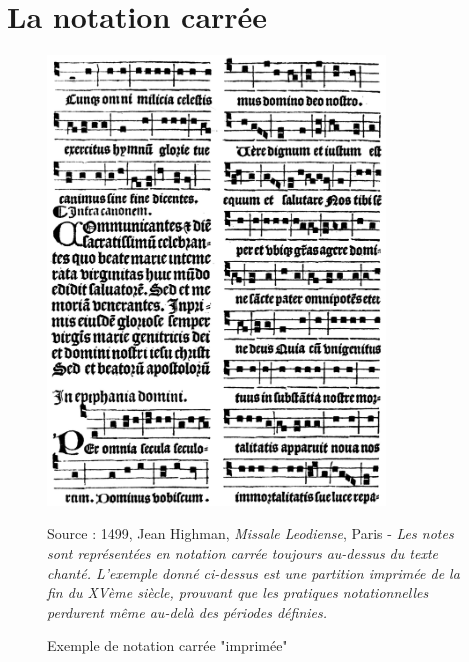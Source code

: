 \section{La notation carrée}
\label{sec:exempleNotationCarree}
\begin{figure}[H]
	\centering
	\includegraphics[keepaspectratio=true, width=0.8\textwidth]{Annexes/i/notationCarree.jpg}
	\caption{Exemple de notation carrée "imprimée"}
	\medskip
	\small
	Source : 1499, Jean Highman, \textit{Missale Leodiense}, Paris - \textit{Les notes sont représentées en notation carrée toujours au-dessus du texte chanté. L'exemple donné ci-dessus est une partition imprimée de la fin du XVème siècle, prouvant que les pratiques notationnelles perdurent même au-delà des périodes définies.}
	\label{fig:notationCarree}
\end{figure}
\clearpage

